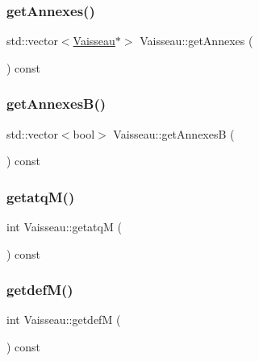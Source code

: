 \mbox{\label{class_vaisseau_a2ae25f56ca61e4d8f2188868ad661a5a}} 
\subsubsection{\texorpdfstring{get\+Annexes()}{getAnnexes()}}
{\footnotesize\ttfamily std\+::vector$<$\hyperlink{class_vaisseau}{Vaisseau}$\ast$$>$ Vaisseau\+::get\+Annexes (\begin{DoxyParamCaption}{ }\end{DoxyParamCaption}) const\hspace{0.3cm}{\ttfamily [inline]}}

\mbox{\label{class_vaisseau_a59054933ea9ba4842739c1e238976c21}} 
\subsubsection{\texorpdfstring{get\+Annexes\+B()}{getAnnexesB()}}
{\footnotesize\ttfamily std\+::vector$<$bool$>$ Vaisseau\+::get\+AnnexesB (\begin{DoxyParamCaption}{ }\end{DoxyParamCaption}) const\hspace{0.3cm}{\ttfamily [inline]}}

\mbox{\label{class_vaisseau_a153fca07385972383606de31774dfd3f}} 
\subsubsection{\texorpdfstring{getatq\+M()}{getatqM()}}
{\footnotesize\ttfamily int Vaisseau\+::getatqM (\begin{DoxyParamCaption}{ }\end{DoxyParamCaption}) const\hspace{0.3cm}{\ttfamily [inline]}}

\mbox{\label{class_vaisseau_adddbf9ab373a0387c4a46d79fa37452f}} 
\subsubsection{\texorpdfstring{getdef\+M()}{getdefM()}}
{\footnotesize\ttfamily int Vaisseau\+::getdefM (\begin{DoxyParamCaption}{ }\end{DoxyParamCaption}) const\hspace{0.3cm}{\ttfamily [inline]}}


